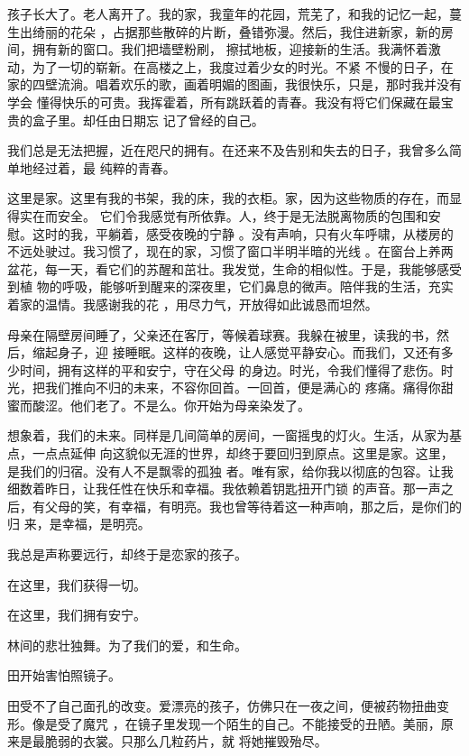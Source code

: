 \documentclass[12pt,a4paper]{article}
\begin{document}
		孩子长大了。老人离开了。我的家，我童年的花园，荒芜了，和我的记忆一起，蔓生出绮丽的花朵
	，占据那些散碎的片断，叠错弥漫。然后，我住进新家，新的房间，拥有新的窗口。我们把墙壁粉刷，
	擦拭地板，迎接新的生活。我满怀着激动，为了一切的崭新。在高楼之上，我度过着少女的时光。不紧
	不慢的日子，在家的四壁流淌。唱着欢乐的歌，画着明媚的图画，我很快乐，只是，那时我并没有学会
	懂得快乐的可贵。我挥霍着，所有跳跃着的青春。我没有将它们保藏在最宝贵的盒子里。却任由日期忘
	记了曾经的自己。

		我们总是无法把握，近在咫尺的拥有。在还来不及告别和失去的日子，我曾多么简单地经过着，最
	纯粹的青春。

		这里是家。这里有我的书架，我的床，我的衣柜。家，因为这些物质的存在，而显得实在而安全。
	它们令我感觉有所依靠。人，终于是无法脱离物质的包围和安慰。这时的我，平躺着，感受夜晚的宁静
	。没有声响，只有火车呼啸，从楼房的不远处驶过。我习惯了，现在的家，习惯了窗口半明半暗的光线
	。在窗台上养两盆花，每一天，看它们的苏醒和茁壮。我发觉，生命的相似性。于是，我能够感受到植
	物的呼吸，能够听到醒来的深夜里，它们鼻息的微声。陪伴我的生活，充实着家的温情。我感谢我的花
	，用尽力气，开放得如此诚恳而坦然。

		母亲在隔壁房间睡了，父亲还在客厅，等候着球赛。我躲在被里，读我的书，然后，缩起身子，迎
	接睡眠。这样的夜晚，让人感觉平静安心。而我们，又还有多少时间，拥有这样的平和安宁，守在父母
	的身边。时光，令我们懂得了悲伤。时光，把我们推向不归的未来，不容你回首。一回首，便是满心的
	疼痛。痛得你甜蜜而酸涩。他们老了。不是么。你开始为母亲染发了。

		想象着，我们的未来。同样是几间简单的房间，一窗摇曳的灯火。生活，从家为基点，一点点延伸
	向这貌似无涯的世界，却终于要回归到原点。这里是家。这里，是我们的归宿。没有人不是飘零的孤独
	者。唯有家，给你我以彻底的包容。让我细数着昨日，让我任性在快乐和幸福。我依赖着钥匙扭开门锁
	的声音。那一声之后，有父母的笑，有幸福，有明亮。我也曾等待着这一种声响，那之后，是你们的归
	来，是幸福，是明亮。

		我总是声称要远行，却终于是恋家的孩子。

		在这里，我们获得一切。

		在这里，我们拥有安宁。

	\endwriting



		林间的悲壮独舞。为了我们的爱，和生命。

		田开始害怕照镜子。

		田受不了自己面孔的改变。爱漂亮的孩子，仿佛只在一夜之间，便被药物扭曲变形。像是受了魔咒
	，在镜子里发现一个陌生的自己。不能接受的丑陋。美丽，原来是最脆弱的衣裳。只那么几粒药片，就
	将她摧毁殆尽。
\end{document}
